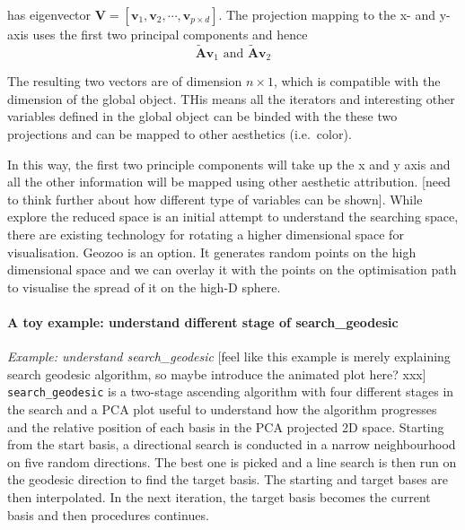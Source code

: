 \documentclass[12pt]{article}
\begin{document}
has eigenvector
\(\mathbf{V} = [\mathbf{v}_1, \mathbf{v}_2, \cdots, \mathbf{v}_{p\times d}]\).
The projection mapping to the x- and y-axis uses the first two principal
components and hence
\[\tilde{\mathbf{A}} \mathbf{v}_1 \text{ and } \tilde{\mathbf{A}} \mathbf{v}_2\]

The resulting two vectors are of dimension \(n \times 1\), which is
compatible with the dimension of the global object. THis means all the
iterators and interesting other variables defined in the global object
can be binded with the these two projections and can be mapped to other
aesthetics (i.e.~color).

In this way, the first two principle components will take up the x and y
axis and all the other information will be mapped using other aesthetic
attribution. {[}need to think further about how different type of
variables can be shown{]}. While explore the reduced space is an initial
attempt to understand the searching space, there are existing technology
for rotating a higher dimensional space for visualisation. Geozoo is an
option. It generates random points on the high dimensional space and we
can overlay it with the points on the optimisation path to visualise the
spread of it on the high-D sphere.

\hypertarget{a-toy-example-understand-different-stage-of-search_geodesic}{%
\paragraph{A toy example: understand different stage of
search\_geodesic}\label{a-toy-example-understand-different-stage-of-search_geodesic}}

\emph{Example: understand search\_geodesic} {[}feel like this example is
merely explaining search geodesic algorithm, so maybe introduce the
animated plot here? xxx{]} \texttt{search\_geodesic} is a two-stage
ascending algorithm with four different stages in the search and a PCA
plot useful to understand how the algorithm progresses and the relative
position of each basis in the PCA projected 2D space. Starting from the
start basis, a directional search is conducted in a narrow neighbourhood
on five random directions. The best one is picked and a line search is
then run on the geodesic direction to find the target basis. The
starting and target bases are then interpolated. In the next iteration,
the target basis becomes the current basis and then procedures
continues.
\end{document}
